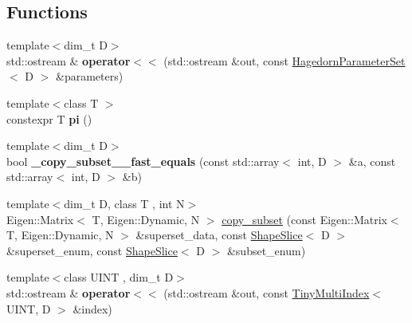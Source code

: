 \subsection*{Functions}
\begin{DoxyCompactItemize}
\item 
\hypertarget{namespacewaveblocks_a7e17c5457572b438bdb7aca00d5c1e6f}{}{\footnotesize template$<$dim\+\_\+t D$>$ }\\std\+::ostream \& {\bfseries operator$<$$<$} (std\+::ostream \&out, const \hyperlink{structwaveblocks_1_1_hagedorn_parameter_set}{Hagedorn\+Parameter\+Set}$<$ D $>$ \&parameters)\label{namespacewaveblocks_a7e17c5457572b438bdb7aca00d5c1e6f}

\item 
\hypertarget{namespacewaveblocks_a05beea1751120610e36d66dfd3f0c47d}{}{\footnotesize template$<$class T $>$ }\\constexpr T {\bfseries pi} ()\label{namespacewaveblocks_a05beea1751120610e36d66dfd3f0c47d}

\item 
\hypertarget{namespacewaveblocks_a6d2a51e600e4e3e6566382f02ad2949a}{}{\footnotesize template$<$dim\+\_\+t D$>$ }\\bool {\bfseries \+\_\+copy\+\_\+subset\+\_\+\+\_\+fast\+\_\+equals} (const std\+::array$<$ int, D $>$ \&a, const std\+::array$<$ int, D $>$ \&b)\label{namespacewaveblocks_a6d2a51e600e4e3e6566382f02ad2949a}

\item 
{\footnotesize template$<$dim\+\_\+t D, class T , int N$>$ }\\Eigen\+::\+Matrix$<$ T, Eigen\+::\+Dynamic, N $>$ \hyperlink{namespacewaveblocks_a1995ca9846205100bf0aa16545d106d8}{copy\+\_\+subset} (const Eigen\+::\+Matrix$<$ T, Eigen\+::\+Dynamic, N $>$ \&superset\+\_\+data, const \hyperlink{classwaveblocks_1_1_shape_slice}{Shape\+Slice}$<$ D $>$ \&superset\+\_\+enum, const \hyperlink{classwaveblocks_1_1_shape_slice}{Shape\+Slice}$<$ D $>$ \&subset\+\_\+enum)
\item 
\hypertarget{namespacewaveblocks_a806045a4272184169ceb86f34e9120bc}{}{\footnotesize template$<$class U\+I\+N\+T , dim\+\_\+t D$>$ }\\std\+::ostream \& {\bfseries operator$<$$<$} (std\+::ostream \&out, const \hyperlink{classwaveblocks_1_1_tiny_multi_index}{Tiny\+Multi\+Index}$<$ U\+I\+N\+T, D $>$ \&index)\label{namespacewaveblocks_a806045a4272184169ceb86f34e9120bc}

\end{DoxyCompactItemize}


